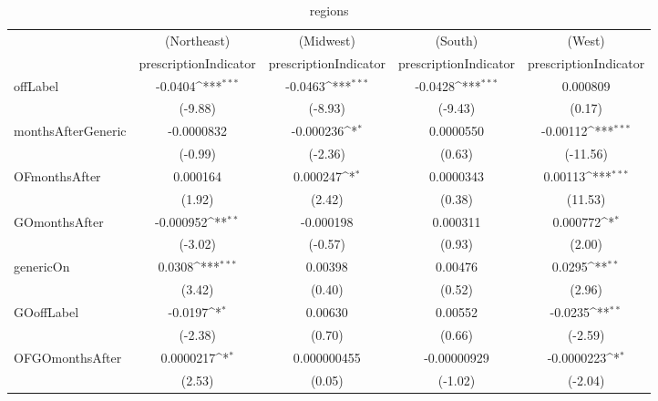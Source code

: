 \begin{table}[htbp]\centering
\def\sym#1{\ifmmode^{#1}\else\(^{#1}\)\fi}
\caption{regions\label{tab1}}
\begin{tabular}{l*{4}{c}}
\hline\hline
            &\multicolumn{1}{c}{(Northeast)}&\multicolumn{1}{c}{(Midwest)}&\multicolumn{1}{c}{(South)}&\multicolumn{1}{c}{(West)}\\
            &\multicolumn{1}{c}{prescriptionIndicator}&\multicolumn{1}{c}{prescriptionIndicator}&\multicolumn{1}{c}{prescriptionIndicator}&\multicolumn{1}{c}{prescriptionIndicator}\\
\hline
offLabel    &     -0.0404\sym{***}&     -0.0463\sym{***}&     -0.0428\sym{***}&    0.000809         \\
            &     (-9.88)         &     (-8.93)         &     (-9.43)         &      (0.17)         \\
[1em]
monthsAfterGeneric&  -0.0000832         &   -0.000236\sym{*}  &   0.0000550         &    -0.00112\sym{***}\\
            &     (-0.99)         &     (-2.36)         &      (0.63)         &    (-11.56)         \\
[1em]
OFmonthsAfter&    0.000164         &    0.000247\sym{*}  &   0.0000343         &     0.00113\sym{***}\\
            &      (1.92)         &      (2.42)         &      (0.38)         &     (11.53)         \\
[1em]
GOmonthsAfter&   -0.000952\sym{**} &   -0.000198         &    0.000311         &    0.000772\sym{*}  \\
            &     (-3.02)         &     (-0.57)         &      (0.93)         &      (2.00)         \\
[1em]
genericOn   &      0.0308\sym{***}&     0.00398         &     0.00476         &      0.0295\sym{**} \\
            &      (3.42)         &      (0.40)         &      (0.52)         &      (2.96)         \\
[1em]
GOoffLabel  &     -0.0197\sym{*}  &     0.00630         &     0.00552         &     -0.0235\sym{**} \\
            &     (-2.38)         &      (0.70)         &      (0.66)         &     (-2.59)         \\
[1em]
OFGOmonthsAfter&   0.0000217\sym{*}  & 0.000000455         & -0.00000929         &  -0.0000223\sym{*}  \\
            &      (2.53)         &      (0.05)         &     (-1.02)         &     (-2.04)         \\

\end{tabular}
\end{table}
